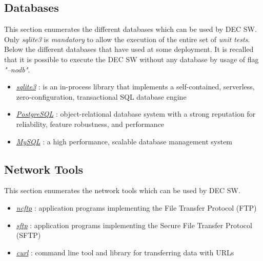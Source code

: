 \documentclass[dec_sum_main.tex]{subfiles}
\begin{document}
\subsection{Databases}
This section enumerates the different databases which can be used by DEC SW. Only \textit{sqlite3} is \textit{mandatory} to allow the execution of the entire set of \textit{unit tests}. Below the different databases that have used at some deployment. It is recalled that it is possible to execute the DEC SW without any database by usage of flag \textit{"--nodb"}.
\par
\begin{itemize}
	\item \href{https://www.sqlite.org}{\textit{sqlite3}} : is an in-process library that implements a self-contained, serverless, zero-configuration, transactional SQL database engine
	\item \href{https://www.postgresql.org/}{\textit{PostgreSQL}} : object-relational database system with a strong reputation for reliability, feature robustness, and performance
	\item \href{https://www.mysql.com/}{\textit{MySQL}} : a high performance, scalable database management system
\end{itemize}

\subsection{Network Tools}
This section enumerates the network tools which can be used by DEC SW.
\par
\begin{itemize}
	\item \href{https://www.ncftp.com}{\textit{ncftp}} : application programs implementing the File Transfer Protocol (FTP)
	\item \href{https://www.openssh.com}{\textit{sftp}} : application programs implementing the Secure File Transfer Protocol (SFTP)
	\item \href{https://curl.haxx.se}{\textit{curl}} : command line tool and library for transferring data with URLs
\end{itemize}
\end{document}
